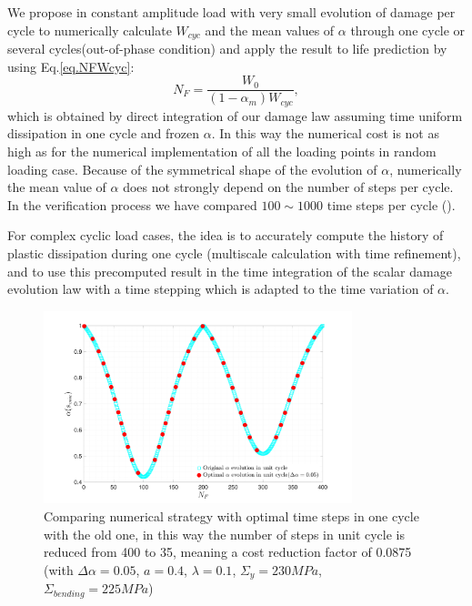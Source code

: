 We propose in constant amplitude load with very small evolution of damage per cycle to numerically calculate $W_{cyc}$ and the mean values of $\alpha$ through one cycle or several cycles(out-of-phase condition) and apply the result to life prediction by using  Eq.\eqref{eq.NFWcyc}:
\begin{equation}
N_F= \dfrac{W_0}{\left( 1-\alpha_m\right) W_{cyc}},
\label{eq.cycNF}
\end{equation}
which is obtained by direct integration of our damage law assuming time uniform dissipation in one cycle and frozen $\alpha$.
In this way the numerical cost is not as high as for the numerical implementation of all the loading points in random loading case. Because of the symmetrical shape of the evolution of $\alpha$, numerically the mean value of $\alpha$ does not strongly depend on the number of steps per cycle. In the verification process we have compared $100\sim1000$ time steps per cycle (). 

For complex cyclic load cases, the idea is to accurately compute the history of plastic dissipation during one cycle (multiscale calculation with time refinement), and to use this precomputed result in the time integration of the scalar damage evolution law with a time stepping which is adapted to the time variation of $\alpha$. 

\begin{figure}[!h]
	\centering
	\includegraphics[width=0.8\textwidth]{figures//alpha_opt_vs_alpha_stepnumber.png} 
	\caption{Comparing numerical strategy with optimal time steps in one cycle with the old one, in this way the number of steps in unit cycle is reduced from 400 to 35, meaning a cost reduction factor of 0.0875 (with $\Delta\alpha=0.05$, $a=0.4$, $\lambda=0.1$, $\Sigma_y=230 MPa$, $\Sigma_{bending}=225 MPa$)}
	\label{fig.alpha_opt_vs_alpha_stepnumber}
\end{figure}

